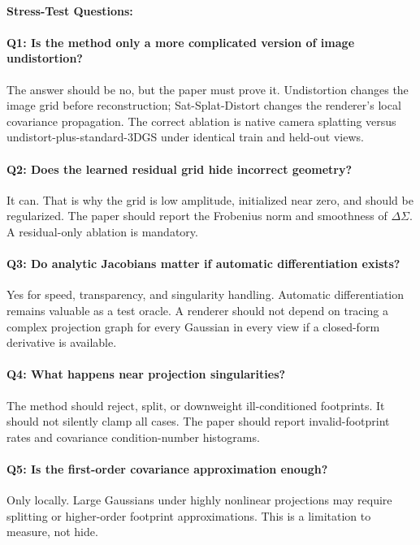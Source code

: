 \documentclass{article}
\begin{document}
\paragraph{Stress-Test Questions:}

\paragraph{Q1: Is the method only a more complicated version of image undistortion?}
The answer should be no, but the paper must prove it. Undistortion changes the image grid before reconstruction; Sat-Splat-Distort changes the renderer's local covariance propagation. The correct ablation is native camera splatting versus undistort-plus-standard-3DGS under identical train and held-out views.

\paragraph{Q2: Does the learned residual grid hide incorrect geometry?}
It can. That is why the grid is low amplitude, initialized near zero, and should be regularized. The paper should report the Frobenius norm and smoothness of $\Delta\Sigma$. A residual-only ablation is mandatory.

\paragraph{Q3: Do analytic Jacobians matter if automatic differentiation exists?}
Yes for speed, transparency, and singularity handling. Automatic differentiation remains valuable as a test oracle. A renderer should not depend on tracing a complex projection graph for every Gaussian in every view if a closed-form derivative is available.

\paragraph{Q4: What happens near projection singularities?}
The method should reject, split, or downweight ill-conditioned footprints. It should not silently clamp all cases. The paper should report invalid-footprint rates and covariance condition-number histograms.

\paragraph{Q5: Is the first-order covariance approximation enough?}
Only locally. Large Gaussians under highly nonlinear projections may require splitting or higher-order footprint approximations. This is a limitation to measure, not hide.
\end{document}
